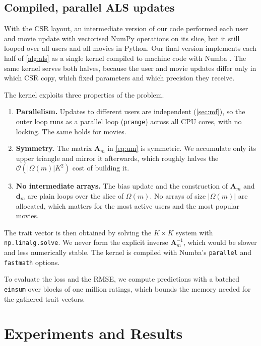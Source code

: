 \documentclass{article}
\theoremstyle{plain}
\theoremstyle{definition}
\theoremstyle{remark}
\begin{document}
\subsection{Compiled, parallel ALS updates}
\label{sec:numba}

With the CSR layout, an intermediate version of our code performed each
user and movie update with vectorised NumPy operations on its slice, but
it still looped over all users and all movies in Python. Our final version
implements each half of \cref{alg:als} as a single kernel compiled to
machine code with Numba \cite{lam2015numba}. The same kernel serves both
halves, because the user and movie updates differ only in which CSR copy,
which fixed parameters and which precision they receive.

The kernel exploits three properties of the problem.
\begin{enumerate}
  \item \textbf{Parallelism.} Updates to different users are independent
        (\cref{sec:mf}), so the outer loop runs as a parallel loop
        (\texttt{prange}) across all CPU cores, with no locking. The same
        holds for movies.
  \item \textbf{Symmetry.} The matrix $\mathbf{A}_m$ in \cref{eq:um} is
        symmetric. We accumulate only its upper triangle and mirror it
        afterwards, which roughly halves the
        $\mathcal{O}(|\Omega(m)|K^2)$ cost of building it.
  \item \textbf{No intermediate arrays.} The bias update and the
        construction of $\mathbf{A}_m$ and $\mathbf{d}_m$ are plain loops
        over the slice of $\Omega(m)$. No arrays of size $|\Omega(m)|$
        are allocated, which matters for the most active users and the
        most popular movies.
\end{enumerate}
The trait vector is then obtained by solving the $K \times K$ system with
\texttt{np.linalg.solve}. We never form the explicit inverse
$\mathbf{A}_m^{-1}$, which would be slower and less numerically stable. The
kernel is compiled with Numba's \texttt{parallel} and \texttt{fastmath}
options.

To evaluate the loss and the RMSE, we compute predictions with a batched
\texttt{einsum} over blocks of one million ratings, which bounds the memory
needed for the gathered trait vectors.

\section{Experiments and Results}
\label{sec:results}
\end{document}
